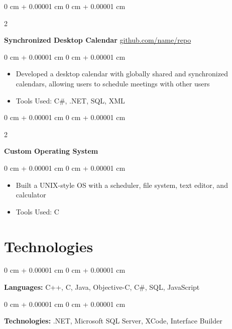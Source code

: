 \documentclass[10pt, letterpaper]{article}
\newenvironment{highlights}{
    \begin{itemize}[
        topsep=0.10 cm,
        parsep=0.10 cm,
        partopsep=0pt,
        itemsep=0pt,
        leftmargin=0 cm + 10pt
    ]
}{
    \end{itemize}
} %
\newenvironment{onecolentry}{
    \begin{adjustwidth}{
        0 cm + 0.00001 cm
    }{
        0 cm + 0.00001 cm
    }
}{
    \end{adjustwidth}
} %
\newenvironment{twocolentry}[2][]{
    \onecolentry
    \def\secondColumn{#2}
    \setcolumnwidth{\fill, 4.5 cm}
    \begin{paracol}{2}
}{
    \switchcolumn \raggedleft \secondColumn
    \end{paracol}
    \endonecolentry
} %
\begin{document}
        \vspace{0.2 cm}

        \begin{twocolentry}{
            \href{https://github.com/sinaatalay/rendercv}{github.com/name/repo}
        }
            \textbf{Synchronized Desktop Calendar}\end{twocolentry}

        \vspace{0.10 cm}
        \begin{onecolentry}
            \begin{highlights}
                \item Developed a desktop calendar with globally shared and synchronized calendars, allowing users to schedule meetings with other users
                \item Tools Used: C\#, .NET, SQL, XML
            \end{highlights}
        \end{onecolentry}


        \vspace{0.2 cm}

        \begin{twocolentry}{
            2002
        }
            \textbf{Custom Operating System}\end{twocolentry}

        \vspace{0.10 cm}
        \begin{onecolentry}
            \begin{highlights}
                \item Built a UNIX-style OS with a scheduler, file system, text editor, and calculator
                \item Tools Used: C
            \end{highlights}
        \end{onecolentry}



    
    \section{Technologies}



        
        \begin{onecolentry}
            \textbf{Languages:} C++, C, Java, Objective-C, C\#, SQL, JavaScript
        \end{onecolentry}

        \vspace{0.2 cm}

        \begin{onecolentry}
            \textbf{Technologies:} .NET, Microsoft SQL Server, XCode, Interface Builder
        \end{onecolentry}


    
\end{document}
